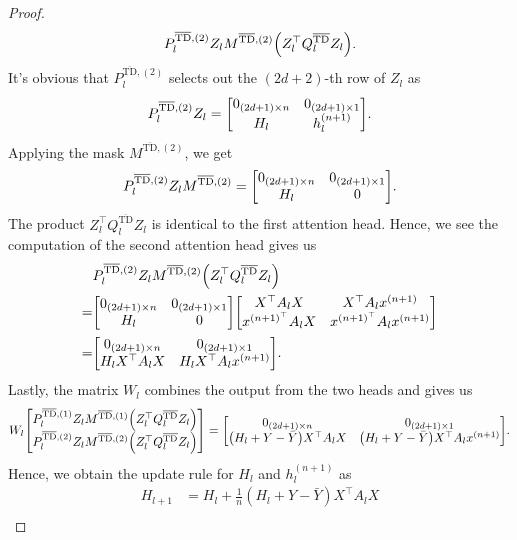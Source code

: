 \documentclass{article}
\newcommand{\bartd}{\overline{\text{TD}}}
\begin{document}
\begin{proof}
\begin{align}
        P_l^{\bartd, (2)} Z_l M^{\bartd, (2)} \qty(Z_l^\top Q_l^{\bartd} Z_l).
    \end{align}
    It's obvious that $P_l^{\bartd, (2)}$ selects out the $(2d+2)$-th row of $Z_l$ as
    \begin{align}
        P_l^{\bartd, (2)} Z_l = \mqty[0_{(2d+1)\times n} & 0_{(2d+1)\times 1}\\
                                      H_l & h_l^{(n+1)}].
    \end{align}
    Applying the mask $M^{\bartd, (2)}$, we get
    \begin{align}
        P_l^{\bartd, (2)} Z_l M^{\bartd, (2)} = \mqty[0_{(2d+1)\times n} & 0_{(2d+1)\times 1}\\
                                                      H_l & 0].
    \end{align}
    The product $Z_l^\top Q_l^{\bartd} Z_l$ is identical to the first attention head.
    Hence, we see the computation of the second attention head gives us
    \begin{align}
        &P_l^{\bartd, (2)} Z_l M^{\bartd, (2)} \qty(Z_l^\top Q_l^{\bartd} Z_l)\\
        =& \mqty[0_{(2d+1)\times n} & 0_{(2d+1)\times 1}\\
                 H_l & 0]
            \mqty[X^\top A_l X & X^\top A_l x^{(n+1)}\\
                  x^{(n+1)^\top} A_l X & x^{(n+1)^\top} A_l x^{(n+1)}]\\
        =& \mqty[0_{(2d+1)\times n} & 0_{(2d+1)\times 1}\\
                 H_l X^\top A_l X & H_l X^\top A_l x^{(n+1)}].
    \end{align}
    Lastly, the matrix $W_l$ combines the output from the two heads and gives us
    \begin{align}
        W_l \mqty[P_l^{\bartd, (1)} Z_l M^{\bartd, (1)} \qty(Z_l^\top Q_l^{\bartd} Z_l)\\
                  P_l^{\bartd, (2)} Z_l M^{\bartd, (2)} \qty(Z_l^\top Q_l^{\bartd} Z_l)]
        = \mqty[0_{(2d+1)\times n} & 0_{(2d+1)\times 1}\\
                \qty(H_l + Y - \bar{Y})X^\top A_l X & \qty(H_l + Y - \bar{Y}) X^\top A_l x^{(n+1)}].
    \end{align}
    Hence, we obtain the update rule for $H_l$ and $h_l^{(n+1)}$ as
    \begin{align}
         H_{l+1} &= H_l + \frac{1}{n} (H_l + Y - \bar{Y}) X^\top A_l X\\

\end{align}
\end{proof}
\end{document}
